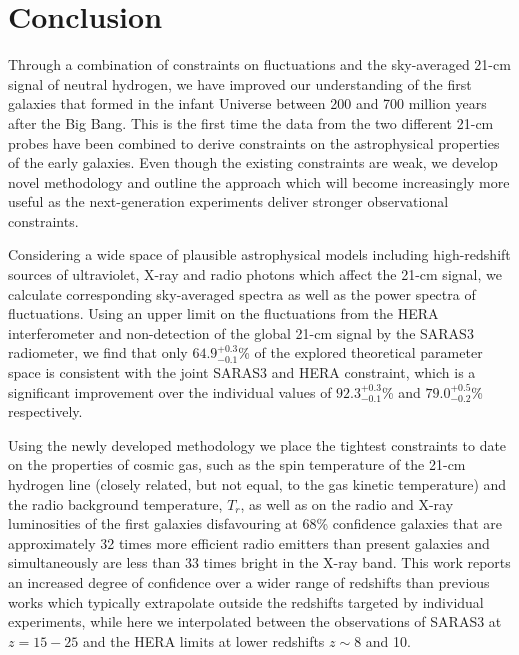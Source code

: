 \section{Conclusion}\label{sec:conclusions_joint}

Through a combination of constraints on fluctuations and the sky-averaged 21-cm signal of neutral hydrogen, we have improved our understanding of the first galaxies that formed in the infant Universe between 200 and 700 million years after the Big Bang. This is the first time the data from the two different 21-cm probes have been combined to derive constraints on the astrophysical properties of the early galaxies. Even though the existing constraints are weak, we develop novel methodology and outline the approach which will become increasingly more useful as the  next-generation experiments  deliver stronger observational constraints. 

Considering a wide space of plausible astrophysical models including high-redshift sources of ultraviolet, X-ray and radio photons which affect the 21-cm signal, we calculate corresponding sky-averaged spectra as well as the power spectra of fluctuations. Using an upper limit on the fluctuations from the HERA interferometer and non-detection of the global 21-cm signal by the SARAS3 radiometer, we find that only $64.9^{+0.3}_{-0.1}$\% of the explored theoretical parameter space is consistent with the joint SARAS3 and HERA constraint, which is a significant improvement over the individual values of $92.3^{+0.3}_{-0.1}$\% and $79.0^{+0.5}_{-0.2}$\% respectively.

Using the newly developed methodology we place the tightest constraints to date on the properties of cosmic gas, such as the spin temperature of the 21-cm hydrogen line (closely related, but not equal, to the gas kinetic temperature) and the radio background temperature, $T_{r}$, as well as on the radio and X-ray luminosities of the first galaxies disfavouring at 68\% confidence galaxies that are approximately 32 times more efficient radio emitters than present galaxies and simultaneously are less than 33 times bright in the X-ray band. This work reports an increased degree of confidence over a wider range of redshifts than previous works which typically extrapolate outside the redshifts targeted by individual experiments, while here we interpolated between the observations of SARAS3 at $z = 15-25$ and the HERA limits at lower redshifts $z\sim8$ and 10. 

